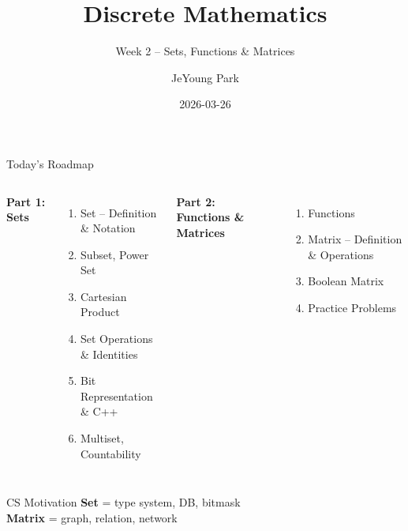 \documentclass{beamer}
\title{Discrete Mathematics}
\subtitle{Week 2 -- Sets, Functions \& Matrices}
\author{JeYoung Park}
\institute{SeoulTech CS\&CE}
\date{2026-03-26}
\begin{document}
\begin{frame}
    \titlepage
\end{frame}

\begin{frame}{Today's Roadmap}
    \small
    \begin{columns}[T]
        \textbf{Part 1: Sets}
        \vspace{0.1cm}

        \footnotesize
        \begin{enumerate}\setlength\itemsep{0.15em}
            \item Set -- Definition \& Notation
            \item Subset, Power Set
            \item Cartesian Product
            \item Set Operations \& Identities
            \item Bit Representation \& C++
            \item Multiset, Countability
        \end{enumerate}

        \textbf{Part 2: Functions \& Matrices}
        \vspace{0.1cm}

        \footnotesize
        \begin{enumerate}\setlength\itemsep{0.15em}
            \setcounter{enumi}{6}
            \item Functions
            \item Matrix -- Definition \& Operations
            \item Boolean Matrix
            \item Practice Problems
        \end{enumerate}
    \end{columns}

    \vspace{0.3cm}
    \begin{alertblock}{CS Motivation}
        \footnotesize
        \textbf{Set} = type system, DB, bitmask\\
        \textbf{Matrix} = graph, relation, network
    \end{alertblock}
\end{frame}
\end{document}
